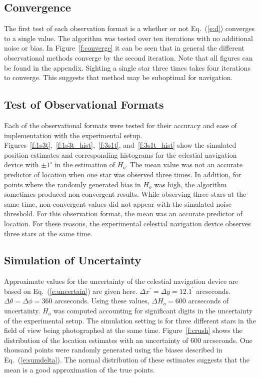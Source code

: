 \documentclass[]{aiaa-tc}%
\begin{document}
\subsection*{Convergence}
The first test of each observation format is a whether or not Eq.~(\ref{e:d}) converges to a single value.  The algorithm was tested over ten iterations with no additional noise or bias. In Figure~\ref{f:converge} it can be seen that in general the different observational methods converge by the second iteration. Note that all figures can be found in the appendix.  Sighting a single star three times takes four iterations to converge.  This suggests that method may be suboptimal for navigation.
\subsection*{Test of Observational Formats}
Each of the observational formats were tested for their accuracy and ease of implementation with the experimental setup.  Figures~\ref{f:1s3t},~\ref{f:1s3t_hist},~\ref{f:3s1t}, and~\ref{f:3s1t_hist} show the simulated position estimates and corresponding histograms for the celestial navigation device with $\pm 1^{\circ}$ in the estimation of $H_{o}$. The mean value was not an accurate predictor of location when one star was observed three times.  In addition, for points where the randomly generated bias in $H_{o}$ was high, the algorithm sometimes produced non-convergent results.   While observing three stars at the same time, non-convergent values did not appear with the simulated noise threshold.  For this observation format, the mean was an accurate predictor of location.  For these reasons, the experimental celestial navigation device observes three stars at the same time.  
\subsection*{Simulation of Uncertainty}
Approximate values for the uncertainty of the celestial navigation device are based on Eq.~(\ref{e:uncertain}) are given here.  $\Delta x^{'} = \Delta y = 12.1^{'}$ arcseconds.  $\Delta \theta = \Delta \phi = 360$ arcseconds.  Using these values, $\Delta H_{o} = 600$ arcseconds of uncertainty.  $H_{o}$ was computed accounting for significant digits in the uncertainty of the experimental setup. The simulation setting is for three different stars in the field of view being photographed at the same time. 
Figure~\ref{f:crush} shows the distribution of the location estimates with an uncertainty of 600 arcseconds.  
One thousand points were randomly generated using the biases described in Eq.~(\ref{e:sumdelta}). The normal distribution of these estimates suggests that the mean is a good approximation of the true points.
\end{document}
